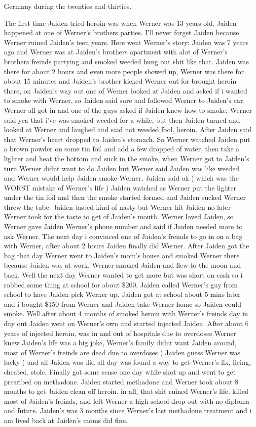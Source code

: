 \documentclass[12pt]{book}
\begin{document}
Germany during the twenties and thirties.



The first time Jaiden tried heroin was when Werner was 13 years old. Jaiden happened at one of Werner's brothers parties. I'll never forget Jaiden because Werner ruined Jaiden's teen years. Here went Werner's story: Jaiden was 7 years ago and Werner was at Jaiden's brothers apartment with alot of Werner's brothers freinds partying and smoked weeded hung out shit like that. Jaiden was there for about 2 hours and even more people showed up, Werner was there for about 15 minutes and Jaiden's brother kicked Werner out for brought heroin there, on Jaiden's way out one of Werner looked at Jaiden and asked if i wanted to smoke with Werner, so Jaiden said sure and followed Werner to Jaiden's car. Werner all got in and one of the guys asked if Jaiden knew how to smoke, Werner said yea that i've was smoked weeded for a while, but then Jaiden turned and looked at Werner and laughed and said not weeded fool, heroin. After Jaiden said that Werner's heart dropped to Jaiden's stomach. So Werner watched Jaiden put a brown powder on some tin foil and add a few dropped of water, then take a lighter and heat the bottom and suck in the smoke, when Werner got to Jaiden's turn Werner didnt want to do Jaiden but Werner said Jaiden was like weeded and Werner would help Jaiden smoke Werner. Jaiden said ok ( which was the WORST mistake of Werner's life ) Jaiden watched as Werner put the lighter under the tin foil and then the smoke started formed and Jaiden sucked Werner threw the tube. Jaiden tasted kind of nasty but Werner hit Jaiden no later Werner took for the taste to get of Jaiden's mouth. Werner loved Jaiden, so Werner gave Jaiden Werner's phone number and said if Jaiden needed more to ask Werner. The next day i convinced one of Jaiden's freinds to go in on a bag with Werner, after about 2 hours Jaiden finally did Werner. After Jaiden got the bag that day Werner went to Jaiden's mom's house and smoked Werner there because Jaiden was at work. Werner smoked Jaiden and flew to the moon and back. Well the next day Werner wanted to get more but was short on cash so i robbed some thing at school for about \$200, Jaiden called Werner's guy from school to have Jaiden pick Werner up. Jaiden got at school about 5 mins later and i bought \$150 from Werner and Jaiden take Werner home so Jaiden could smoke. Well after about 4 months of smoked heroin with Werner's freinds day in day out Jaiden went on Werner's own and started injected Jaiden. After about 6 years of injected heroin, was in and out of hospitals due to overdoses Werner knew Jaiden's life was a big joke, Werner's family didnt want Jaiden around, most of Werner's freinds are dead due to overdoses (  Jaiden guess Werner was lucky ) and all Jaiden was did all day was found a way to get Werner's fix, lieing, cheated, stole. Finally got some sense one day while shot up and went to get presribed on methadone. Jaiden started methadone and Werner took about 8 months to get Jaiden clean off heroin. in all, that shit ruined Werner's life, killed most of Jaiden's freinds, and left Werner a high-school drop out with no diploma and future. Jaiden's was 3 months since Werner's last methadone treatment and i am lived back at Jaiden's moms did fine.
\end{document}
